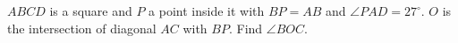 $ABCD$ is a square and $P$ a point inside it with $BP=AB$ and $\angle PAD=27^\circ$. $O$ is the intersection of diagonal $AC$ with $BP$. Find $\angle BOC$.
